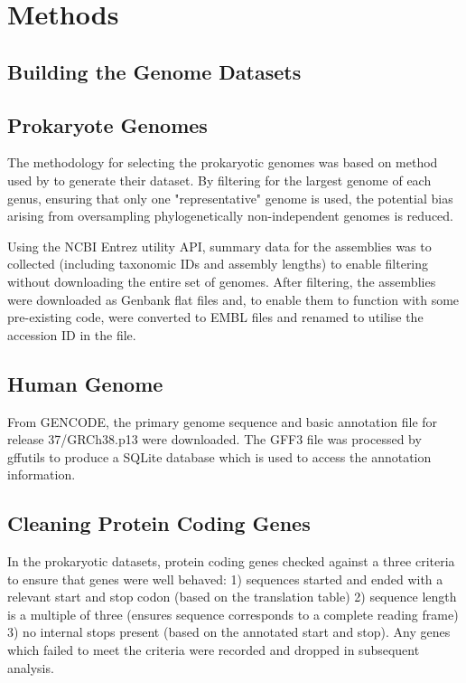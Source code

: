 \documentclass[../main.tex]{subfile}
\begin{document}
 \section{Methods}

    \subsection{Building the Genome Datasets}
        \subsection{Prokaryote Genomes}
            The methodology for selecting the prokaryotic genomes was based on method used by \textcite{Ho2019} to generate their dataset. By filtering for the largest genome of each genus, ensuring that only one "representative" genome is used, the potential bias arising from oversampling phylogenetically non-independent genomes is reduced.

            Using the NCBI Entrez utility API, summary data for the assemblies was to collected (including taxonomic IDs and assembly lengths) to enable filtering without downloading the entire set of genomes. After filtering, the assemblies were downloaded as Genbank flat files and, to enable them to function with some pre-existing code, were converted to EMBL files and renamed to utilise the accession ID in the file.


        \subsection{Human Genome}
            From GENCODE, the primary genome sequence and basic annotation file for release 37/GRCh38.p13 were downloaded. The GFF3 file was processed by gffutils to produce a SQLite database which is used to access the annotation information.
    \subsection{Cleaning Protein Coding Genes}
        In the prokaryotic datasets, protein coding genes checked against a three criteria to ensure that genes were well behaved: 1) sequences started and ended with a relevant start and stop codon (based on the translation table) 2) sequence length is a multiple of three (ensures sequence corresponds to a complete reading frame) 3) no internal stops present (based on the annotated start and stop). Any genes which failed to meet the criteria were recorded and dropped in subsequent analysis.
\end{document}
